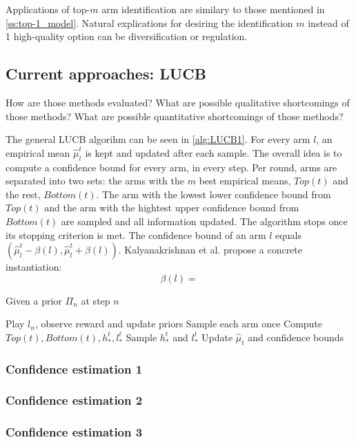 Applications of top-$m$ arm identification are similary to those mentioned in \ref{ss:top-1_model}. Natural explications for desiring the identification $m$ instead of 1 high-quality option can be diversification or regulation.

\subsection{Current approaches: LUCB}
How are those methods evaluated?
What are possible qualitative shortcomings of those methods?
What are possible quantitative shortcomings of those methods?

The general LUCB algorihm can be seen in \ref{alg:LUCB1}. For every arm $l$, an empirical mean $\hat{\mu}_l^t$ is kept and updated after each sample. The overall idea is to compute a confidence bound for every arm, in every step. Per round, arms are separated into two sets: the arms with the $m$ best empirical means, $Top(t)$ and the rest, $Bottom(t)$. The arm with the lowest lower confidence bound from $Top(t)$ and the arm with the hightest upper confidence bound from $Bottom(t)$ are sampled and all information updated.
The algorithm stops once its stopping criterion is met. The confidence bound of an arm $l$ equals $(\hat{\mu}_l^t - \beta(l), \hat{\mu}_l^t + \beta(l))$.
Kalyanakrishnan et al. \cite{DBLP:conf/icml/KalyanakrishnanTAS12} propose a concrete instantiation:
\[\beta(l) = \]

\begin{algorithm}[H]
    \caption{Given a prior $\Pi_n$ at step $n$}
    \label{alg:LUCB1}
  \begin{algorithmic}
    \State Play $l_n$, observe reward and update priors
    \State Sample each arm once
    \Repeat
      \State Compute $Top(t), Bottom(t), h_*^t, l_*^t$
      \State Sample $h_*^t$ and $l_*^t$
      \State Update $\hat{\mu}_t$ and confidence bounds
    \Until{$ \mu < \epsilon$}
  \end{algorithmic}
\end{algorithm}


\subsubsection{Confidence estimation 1}
\subsubsection{Confidence estimation 2}
\subsubsection{Confidence estimation 3}


